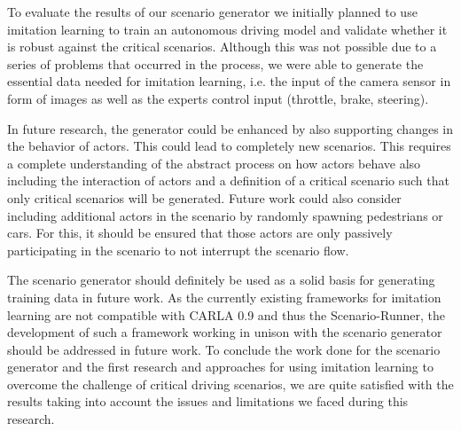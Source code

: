 \documentclass[conference, a4paper, 11pt]{IEEEtran}
\begin{document}
	To evaluate the results of our scenario generator we initially planned to use imitation learning to train an autonomous driving model and validate whether it is robust against the critical scenarios. Although this was not possible due to a series of problems that occurred in the process, we were able to generate the essential data needed for imitation learning, i.e. the input of the camera sensor in form of images as well as the experts control input (throttle, brake, steering).
	
	In future research, the generator could be enhanced by also supporting changes in the behavior of actors. This could lead to completely new scenarios. This requires a complete understanding of the abstract process on how actors behave also including the interaction of actors and a definition of a critical scenario such that only critical scenarios will be generated.
	Future work could also consider including additional actors in the scenario by randomly spawning pedestrians or cars. For this, it should be ensured that those actors are only passively participating in the scenario to not interrupt the scenario flow.
	
	The scenario generator should definitely be used as a solid basis for generating training data in future work. As the currently existing frameworks for imitation learning are not compatible with CARLA 0.9 and thus the Scenario-Runner, the development of such a framework working in unison with the scenario generator should be addressed in future work.
	To conclude the work done for the scenario generator and the first research and approaches for using imitation learning to overcome the challenge of critical driving scenarios, we are quite satisfied with the results taking into account the issues and limitations we faced during this research.
	
	\newpage
	\printbibliography
	
	\newpage
	\onecolumn
	\appendix\
	\label{appendix}
	
\end{document}
